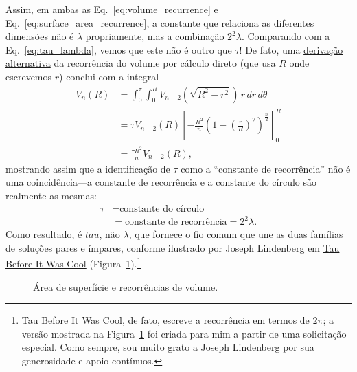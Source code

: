 Assim, em ambas as Eq.~\eqref{eq:volume_recurrence} e Eq.~\eqref{eq:surface_area_recurrence}, a constante que relaciona as diferentes dimensões não é $\lambda$ propriamente, mas a combinação $2^2\lambda$. Comparando com a Eq.~\eqref{eq:tau_lambda}, vemos que este não é outro que $\tau$! De fato, uma \href{https://en.wikipedia.org/wiki/Volume_of_an_n-ball#The_two-dimension_recursion_formula}{derivação alternativa} da recorrência do volume por cálculo direto (que usa $R$ onde escrevemos $r$) conclui com a integral
\begin{equation}
\label{eq:integral_recurrence}
\begin{split}
V_n(R) & = \int_0^\tau \int_0^R V_{n-2}\left(\sqrt{R^2 - r^2}\right) \,r\,dr\,d\theta \\
       & = \tau V_{n-2}(R) \left[-\frac{R^2}{n}\left(1 - \left(\frac{r}{R}\right)^2\right)^\frac{n}{2}\right]_{0}^{R} \\
       & = \frac{\tau R^2}{n} V_{n-2}(R),
\end{split}
\end{equation}
mostrando assim que a identificação de $\tau$ como a ``constante de recorrência'' não é uma coincidência---a constante de recorrência e a constante do círculo são realmente as mesmas:
\[
\begin{split}
\tau & = \mbox{constante do círculo} \\
     & = \mbox{constante de recorrência} = 2^2\lambda.
\end{split}
\]
Como resultado, é $tau$, não $\lambda$, que fornece o fio comum que une as duas famílias de soluções pares e ímpares, conforme ilustrado por Joseph Lindenberg em \href{http://sites.google.com/site/taubeforeitwascool/}{Tau Before It Was Cool} (Figura~\ref{fig:Nspheres}).\footnote{\href{http://sites.google.com/site/taubeforeitwascool/}{Tau Before It Was Cool}, de fato, escreve a recorrência em termos de $2\pi$; a versão mostrada na Figura~\ref{fig:Nspheres} foi criada para mim a partir de uma solicitação especial. Como sempre, sou muito grato a Joseph Lindenberg por sua generosidade e apoio contínuos.}

\begin{figure}
\begin{center}
\end{center}
\caption{Área de superfície e recorrências de volume.\label{fig:Nspheres}}
\end{figure}

